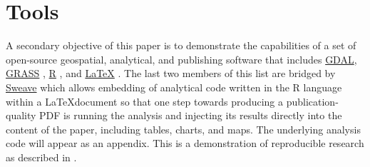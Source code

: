 \section{Tools}
\label{sec:tools}

A secondary objective of this paper is to demonstrate the capabilities
of a set of open-source geospatial, analytical, and publishing
software that includes \href{http://www.gdal.org/}{GDAL},
\href{http://grass.osgeo.org/}{GRASS} \citep{GRASS},
\href{http://www.r-project.org/}{R} \citep{R} , and
\href{http://www.latex-project.org/}{\LaTeX} \citep{Lamport1994} .
The last two members of this list are bridged by
\href{http://www.stat.uni-muenchen.de/~leisch/Sweave/}{Sweave}
\citep{Leisch2002} which allows embedding of analytical code written
in the R language within a \LaTeX document so that one step towards
producing a publication-quality PDF is running the analysis and
injecting its results directly into the content of the paper,
including tables, charts, and maps.  The underlying analysis code will
appear as an appendix.  This is a demonstration of reproducible
research as described in \citet{Gentleman2007}.
